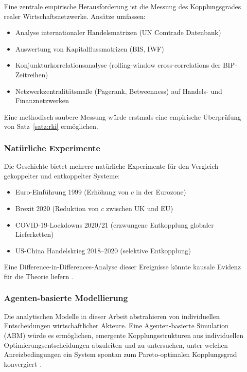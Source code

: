 \documentclass[a4paper, 12pt, twoside, openright]{report}
\theoremstyle{definition}
\theoremstyle{definition}
\begin{document}
Eine zentrale empirische Herausforderung ist die Messung des Kopplungsgrades realer
Wirtschaftsnetzwerke. Ansätze umfassen:
\begin{itemize}
    \item Analyse internationaler Handelsmatrizen (UN Comtrade Datenbank)
    \item Auswertung von Kapitalflussmatrizen (BIS, IWF)
    \item Konjunkturkorrelationsanalyse (rolling-window cross-correlations der BIP-Zeitreihen)
    \item Netzwerkzentralitätsmaße (Pagerank, Betweenness) auf Handels- und Finanznetzwerken
\end{itemize}
Eine methodisch saubere Messung würde erstmals eine empirische Überprüfung von
Satz~\ref{satz:rki} ermöglichen.

\subsubsection{Natürliche Experimente}

Die Geschichte bietet mehrere natürliche Experimente für den Vergleich gekoppelter und
entkoppelter Systeme:
\begin{itemize}
    \item Euro-Einführung 1999 (Erhöhung von $c$ in der Eurozone)
    \item Brexit 2020 (Reduktion von $c$ zwischen UK und EU)
    \item COVID-19-Lockdowns 2020/21 (erzwungene Entkopplung globaler Lieferketten)
    \item US-China Handelskrieg 2018--2020 (selektive Entkopplung)
\end{itemize}
Eine Difference-in-Differences-Analyse dieser Ereignisse könnte kausale Evidenz
für die Theorie liefern \citep{callaway2021difference}.

\subsubsection{Agenten-basierte Modellierung}

Die analytischen Modelle in dieser Arbeit abstrahieren von individuellen Entscheidungen
wirtschaftlicher Akteure. Eine Agenten-basierte Simulation (ABM) würde es ermöglichen,
emergente Kopplungsstrukturen aus individuellen Optimierungsentscheidungen abzuleiten
und zu untersuchen, unter welchen Anreizbedingungen ein System spontan zum Pareto-optimalen
Kopplungsgrad konvergiert \citep{tesfatsion2006handbook}.
\end{document}
